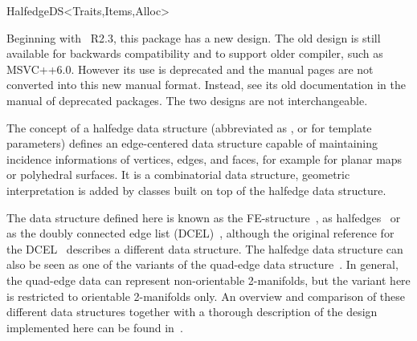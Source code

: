 
\ccRefPageBegin



\begin{ccRefConcept}{HalfedgeDS<Traits,Items,Alloc>}

\ccTagFullDeclarations


Beginning with \cgal\ R2.3, this package has a new design.  The old
design is still available for backwards compatibility and to support
older compiler, such as MSVC++6.0. However its use is deprecated and
the manual pages are not converted into this new manual
format. Instead, see its old documentation in the manual of 
deprecated packages.  The two designs are not interchangeable.

\ccDefinition
  
The concept of a halfedge data structure (abbreviated as , or
 for template parameters) defines an edge-centered data structure
capable of maintaining incidence informations of vertices, edges, and
faces, for example for planar maps or polyhedral surfaces. It is a
combinatorial data structure, geometric interpretation is added by
classes built on top of the halfedge data structure.

The data structure defined here is known as the
FE-structure~\cite{w-ebdss-85}, as
halfedges~\cite{m-ism-88,bfh-mgedm-95} or as the doubly connected edge
list (DCEL)~\cite{bkos-cgaa-97}, although the original reference for
the DCEL~\cite{mp-fitcp-78} describes a different data structure. The
halfedge data structure can also be seen as one of the variants of the
quad-edge data structure~\cite{gs-pmgsc-85}. In general, the quad-edge
data can represent non-orientable 2-manifolds, but the variant here is
restricted to orientable 2-manifolds only. An overview and comparison
of these different data structures together with a thorough
description of the design implemented here can be found
in~\cite{k-ugpdd-99}.


\end{ccRefConcept}
